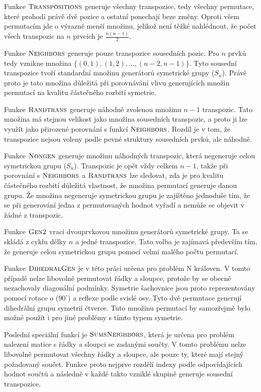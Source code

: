 Funkce $\textproc{Transpositions}$ generuje všechny transpozice, tedy všechny permutace, které prohodí právě dvě pozice a ostatní ponechají beze změny. Oproti všem permutacím jde o výrazně menší množinu, jelikož není těžké nahlédnout, že počet všech transpozic na $n$ prvcích je $\frac{n(n-1)}{2}$.

Funkce $\textproc{Neighbors}$ generuje pouze transpozice sousedních pozic. Pro $n$ prvků tedy vznikne množina
$\{(0,1), (1,2), \ldots, (n-2,n-1)\}$. Tyto sousední transpozice tvoří standardní množinu generátorů symetrické grupy ($S_n$). Právě proto je tato množina důležitá při porovnávání vlivu generujících množin permutací na kvalitu částečného rozbití symetrie.

Funkce $\textproc{Randtrans}$ generuje náhodně zvolenou množinu $n-1$ transpozic. Tato množina má stejnou velikost jako množina sousedních transpozic, a proto ji lze využít jako přirozené porovnání s funkcí $\textproc{Neighbors}$. Rozdíl je v tom, že transpozice nejsou voleny podle pevné struktury sousedních prvků, ale náhodně.

Funkce $\textproc{Nongen}$ generuje množinu náhodných transpozic, která negeneruje celou symetrickou grupu ($S_n$). Transpozic je opět vždy celkem $n-1$, takže při porovnání s $\textproc{Neighbors}$ a $\textproc{Randtrans}$ lze sledovat, zda je pro kvalitu částečného rozbití důležitá vlastnost, že množina permutací generuje danou grupu. Že množina negeneruje symetrickou grupu je zajištěno jednoduše tím, že se při generování jedna z permutovaných hodnot vyřadí a nemůže se objevit v žádné z transpozic.

Funkce $\textproc{Gen2}$ vrací dvouprvkovou množinu generátorů symetrické grupy. Ta se skládá z cyklu délky $n$ a jedné transpozice. Tato volba je zajímavá především tím, že generuje celou symetrickou grupu pomocí velmi malého počtu permutací.

Funkce $\textproc{DihedralGen}$ je v této práci určena pro problém N královen. V tomto případě nelze libovolně permutovat řádky a sloupce, protože by se obecně nezachovaly diagonální podmínky. Symetrie šachovnice jsou proto reprezentovány pomocí rotace o ($90^\circ$) a reflexe podle svislé osy. Tyto dvě permutace generují dihedrální grupu symetrií čtverce. Tuto množinu permutací by samozřejmě bylo možné použít i pro jiné problémy s tímto typem symetrie.

Poslední speciální funkcí je $\textproc{SumsNeighbors}$, která je určena pro problém nalezení matice s řádky a sloupci se zadanými součty. V tomto problému nelze libovolně permutovat všechny řádky a sloupce, ale pouze ty, které mají stejný požadovaný součet. Funkce proto nejprve rozdělí indexy podle odpovídajících hodnot součtů a následně v každé takto vzniklé skupině generuje sousední transpozice.

